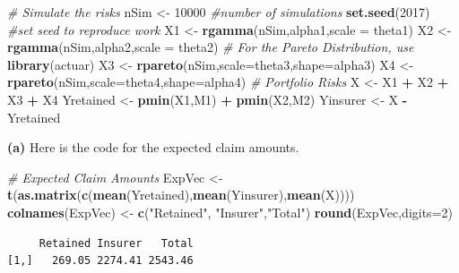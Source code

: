 \documentclass[]{book}
\newenvironment{Shaded}{\begin{snugshade}}{\end{snugshade}}
\newcommand{\KeywordTok}[1]{\textcolor[rgb]{0.13,0.29,0.53}{\textbf{#1}}}
\newcommand{\DataTypeTok}[1]{\textcolor[rgb]{0.13,0.29,0.53}{#1}}
\newcommand{\DecValTok}[1]{\textcolor[rgb]{0.00,0.00,0.81}{#1}}
\newcommand{\StringTok}[1]{\textcolor[rgb]{0.31,0.60,0.02}{#1}}
\newcommand{\CommentTok}[1]{\textcolor[rgb]{0.56,0.35,0.01}{\textit{#1}}}
\newcommand{\OperatorTok}[1]{\textcolor[rgb]{0.81,0.36,0.00}{\textbf{#1}}}
\newcommand{\NormalTok}[1]{#1}
\theoremstyle{definition}
\theoremstyle{definition}
\theoremstyle{definition}
\theoremstyle{remark}
\begin{document}
\begin{Shaded}
\begin{Highlighting}[]
\CommentTok{# Simulate the risks}
\NormalTok{nSim <-}\StringTok{ }\DecValTok{10000}  \CommentTok{#number of simulations}
\KeywordTok{set.seed}\NormalTok{(}\DecValTok{2017}\NormalTok{) }\CommentTok{#set seed to reproduce work }
\NormalTok{X1 <-}\StringTok{ }\KeywordTok{rgamma}\NormalTok{(nSim,alpha1,}\DataTypeTok{scale =}\NormalTok{ theta1)  }
\NormalTok{X2 <-}\StringTok{ }\KeywordTok{rgamma}\NormalTok{(nSim,alpha2,}\DataTypeTok{scale =}\NormalTok{ theta2)  }
\CommentTok{# For the Pareto Distribution, use}
\KeywordTok{library}\NormalTok{(actuar)}
\NormalTok{X3 <-}\StringTok{ }\KeywordTok{rpareto}\NormalTok{(nSim,}\DataTypeTok{scale=}\NormalTok{theta3,}\DataTypeTok{shape=}\NormalTok{alpha3)}
\NormalTok{X4 <-}\StringTok{ }\KeywordTok{rpareto}\NormalTok{(nSim,}\DataTypeTok{scale=}\NormalTok{theta4,}\DataTypeTok{shape=}\NormalTok{alpha4)}
\CommentTok{# Portfolio Risks}
\NormalTok{X         <-}\StringTok{ }\NormalTok{X1 }\OperatorTok{+}\StringTok{ }\NormalTok{X2 }\OperatorTok{+}\StringTok{ }\NormalTok{X3 }\OperatorTok{+}\StringTok{ }\NormalTok{X4}
\NormalTok{Yretained <-}\StringTok{ }\KeywordTok{pmin}\NormalTok{(X1,M1) }\OperatorTok{+}\StringTok{ }\KeywordTok{pmin}\NormalTok{(X2,M2)}
\NormalTok{Yinsurer  <-}\StringTok{ }\NormalTok{X }\OperatorTok{-}\StringTok{ }\NormalTok{Yretained}
\end{Highlighting}
\end{Shaded}

\textbf{(a)} Here is the code for the expected claim amounts.

\begin{Shaded}
\begin{Highlighting}[]
\CommentTok{# Expected Claim Amounts}
\NormalTok{ExpVec <-}\StringTok{ }\KeywordTok{t}\NormalTok{(}\KeywordTok{as.matrix}\NormalTok{(}\KeywordTok{c}\NormalTok{(}\KeywordTok{mean}\NormalTok{(Yretained),}\KeywordTok{mean}\NormalTok{(Yinsurer),}\KeywordTok{mean}\NormalTok{(X))))}
\KeywordTok{colnames}\NormalTok{(ExpVec) <-}\StringTok{ }\KeywordTok{c}\NormalTok{(}\StringTok{"Retained"}\NormalTok{, }\StringTok{"Insurer"}\NormalTok{,}\StringTok{"Total"}\NormalTok{)}
\KeywordTok{round}\NormalTok{(ExpVec,}\DataTypeTok{digits=}\DecValTok{2}\NormalTok{)}
\end{Highlighting}
\end{Shaded}

\begin{verbatim}
     Retained Insurer   Total
[1,]   269.05 2274.41 2543.46
\end{verbatim}
\end{document}
